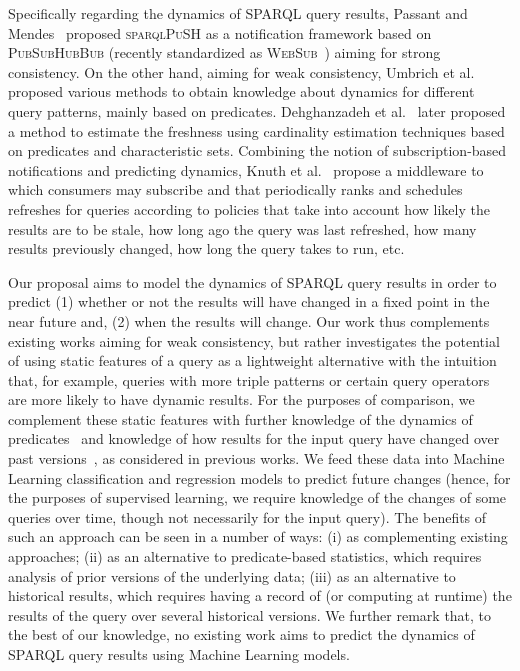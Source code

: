 \documentclass[runningheads]{llncs}
\begin{document}
%  

Specifically regarding the dynamics of SPARQL query results, Passant and Mendes~\cite{PassantM10} proposed \textsc{sparqlPuSH} as a notification framework based  on \textsc{PubSubHubBub} (recently standardized as \textsc{WebSub}~\cite{webSub18}) aiming for strong consistency. On the other hand, aiming for weak consistency, Umbrich et al.~\cite{UmbrichKHP12,UmbrichKPPH12,ekawUmbrichKHP12} proposed various methods to obtain knowledge about dynamics for different query patterns, mainly based on predicates. Dehghanzadeh et al.~\cite{DehghanzadehPKUHD14} later proposed a method to estimate the freshness using cardinality estimation techniques based on predicates and characteristic sets. Combining the notion of subscription-based notifications and predicting dynamics, Knuth et al.~\cite{KnuthHS16} propose a middleware to which consumers may subscribe and that periodically ranks and schedules refreshes for queries according to policies that take into account how likely the results are to be stale, how long ago the query was last refreshed, how many results previously changed, how long the query takes to run, etc. 

Our proposal aims to model the dynamics of SPARQL query results in order to predict (1) whether or not the results will have changed in a fixed point in the near future and,  (2) when the results will change. Our work thus complements existing works aiming for weak consistency, but rather investigates the potential of using static features of a query as a lightweight alternative with the intuition that, for example, queries with more triple patterns or certain query operators are more likely to have dynamic results. For the purposes of comparison, we complement these static features with further knowledge of the dynamics of predicates~\cite{UmbrichKHP12,UmbrichKPPH12,ekawUmbrichKHP12,DehghanzadehPKUHD14} and knowledge of how results for the input query have changed over past versions~\cite{KnuthHS16}, as considered in previous works. We feed these data into Machine Learning classification and regression models to predict future changes (hence, for the purposes of supervised learning, we require knowledge of the changes of some queries over time, though not necessarily for the input query). The benefits of such an approach can be seen in a number of ways: (i) as complementing existing approaches; (ii) as an alternative to predicate-based statistics, which requires analysis of prior versions of the underlying data; (iii) as an alternative to historical results, which requires having a record of (or computing at runtime) the results of the query over several historical versions. We further remark that, to the best of our knowledge, no existing work aims to predict the dynamics of SPARQL query results using Machine Learning models.
\end{document}
